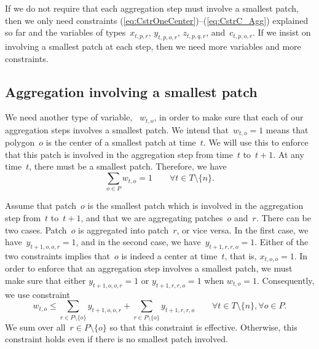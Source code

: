 If we do not require that 
each aggregation step must involve a smallest patch,
then we only need constraints
(\ref{eq:CstrOneCenter})--(\ref{eq:CstrC_Agg})
explained so far 
and the variables of 
types~$x_{t,p,r}$, $y_{t,p,o,r}$, $z_{t,p,q,r}$,
and~$c_{t,p,o,r}$.
If we insist on involving a smallest patch at each step,
then we need more variables and more constraints.


\subsection{Aggregation involving a smallest patch}

We need another type of variable, ~$w_{t,o}$, 
in order to make sure that 
each of our aggregation steps involves a smallest patch.
We intend that~$w_{t,o}=1$ means 
that polygon~$o$ is the center of 
a smallest patch at time~$t$.
We will use this to enforce that
this patch is involved in the aggregation step 
from time~$t$ to~$t+1$.
At any time~$t$, there must be a smallest patch.
Therefore, we have
\begin{equation}
\label{eq:CstrSOneSmallest}
\sum_{o\in P}w_{t,o} =1 \qquad 
\forall t \in {T}\setminus \{n\}.
\end{equation}

Assume that patch~$o$ is the smallest patch
which is involved in the aggregation step from~$t$ to~$t+1$,
and that we are aggregating patches~$o$ and~$r$.
There can be two cases.
Patch~$o$ is aggregated into patch~$r$, or vice versa.
In the first case, we have~$y_{t+1,o,o,r}=1$,
and in the second case, we have~$y_{t+1,r,r,o}=1$.
Either of the two constraints implies 
that~$o$ is indeed a center at time~$t$, that is, $x_{t,o,o} =1$.
In order to enforce that
an aggregation step involves a smallest patch,
we must make sure that 
either $y_{t+1,o,o,r}=1$ or $y_{t+1,r,r,o}=1$ 
when $w_{t,o}=1$.
Consequently, we use constraint
\begin{equation}
\label{eq:CstrSInvolveSmallest}
w_{t,o} \le 
\sum_{r\in P\setminus \{o\}} y_{t+1,o,o,r} + 
\sum_{r\in P\setminus \{o\}} y_{t+1,r,r,o} \qquad
\forall t \in 
{T}\setminus \{n\}, \forall o \in P.
\end{equation}
We sum over all~$r\in P\setminus \{o\}$
so that this constraint is effective.
Otherwise, this constraint holds even if 
there is no smallest patch involved.

